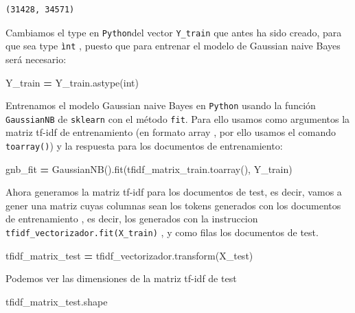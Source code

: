 \documentclass[
  11pt,
  a4paper,
]{article}
\newenvironment{Shaded}{\begin{snugshade}}{\end{snugshade}}
\newcommand{\NormalTok}[1]{#1}
\newcommand{\OperatorTok}[1]{\textcolor[rgb]{0.81,0.36,0.00}{\textbf{#1}}}
\newcommand{\StringTok}[1]{\textcolor[rgb]{0.31,0.60,0.02}{#1}}
\begin{document}
\begin{verbatim}
(31428, 34571)
\end{verbatim}

Cambiamos el type en \texttt{Python}del vector \texttt{Y\_train} que
antes ha sido creado, para que sea type \texttt{ìnt} , puesto que para
entrenar el modelo de Gaussian naive Bayes será necesario:

\begin{Shaded}
\begin{Highlighting}[]
\NormalTok{Y\_train }\OperatorTok{=}\NormalTok{ Y\_train.astype(}\StringTok{\textquotesingle{}int\textquotesingle{}}\NormalTok{)}
\end{Highlighting}
\end{Shaded}

Entrenamos el modelo Gaussian naive Bayes en \texttt{Python} usando la
función \texttt{GaussianNB} de \texttt{sklearn} con el método
\texttt{fit}. Para ello usamos como argumentos la matriz tf-idf de
entrenamiento (en formato array , por ello usamos el comando
\texttt{toarray()}) y la respuesta para los documentos de entrenamiento:

\begin{Shaded}
\begin{Highlighting}[]
\NormalTok{gnb\_fit }\OperatorTok{=}\NormalTok{ GaussianNB().fit(tfidf\_matrix\_train.toarray(), Y\_train)}
\end{Highlighting}
\end{Shaded}

Ahora generamos la matriz tf-idf para los documentos de test, es decir,
vamos a gener una matriz cuyas columnas sean los tokens generados con
los documentos de entrenamiento , es decir, los generados con la
instruccion \texttt{tfidf\_vectorizador.fit(X\_train)} , y como filas
los documentos de test.

\begin{Shaded}
\begin{Highlighting}[]
\NormalTok{tfidf\_matrix\_test }\OperatorTok{=}\NormalTok{ tfidf\_vectorizador.transform(X\_test)}
\end{Highlighting}
\end{Shaded}

Podemos ver las dimensiones de la matriz tf-idf de test

\begin{Shaded}
\begin{Highlighting}[]
\NormalTok{tfidf\_matrix\_test.shape}
\end{Highlighting}
\end{Shaded}
\end{document}
